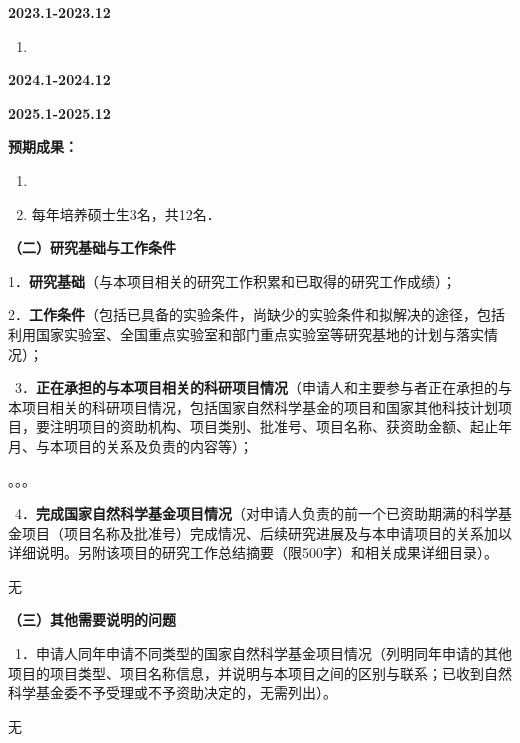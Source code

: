 \documentclass[UTF8,A4]{ctexart}
\newcommand{\blue}{\textcolor[rgb]{0.00,0.44,0.75}}
\begin{document}
\noindent\textbf{2023.1-2023.12}
\begin{enumerate}
  \item
\end{enumerate}


\noindent\textbf{2024.1-2024.12}



\noindent\textbf{2025.1-2025.12}




\textbf{预期成果：}

\begin{enumerate}
  \item
  \item 每年培养硕士生3名，共12名．
\end{enumerate}

\pagebreak[4]
\begin{spacing}{1.6}
\kaishu
\blue{\textbf{（二）研究基础与工作条件}}

\blue{1．\textbf{研究基础}（与本项目相关的研究工作积累和已取得的研究工作成绩）；}
\end{spacing}

\begin{spacing}{1.6}
\kaishu
\blue{2．\textbf{工作条件}（包括已具备的实验条件，尚缺少的实验条件和拟解决的途径，包括利用国家实验室、全国重点实验室和部门重点实验室等研究基地的计划与落实情况）；}
\end{spacing}


\pagebreak[4]
\begin{spacing}{1.6}
\kaishu
\blue{~3．\textbf{正在承担的与本项目相关的科研项目情况}（申请人和主要参与者正在承担的与本项目相关的科研项目情况，包括国家自然科学基金的项目和国家其他科技计划项目，要注明项目的资助机构、项目类别、批准号、项目名称、获资助金额、起止年月、与本项目的关系及负责的内容等）；}
\end{spacing}
。。。

\begin{spacing}{1.6}
\kaishu
\blue{~4．\textbf{完成国家自然科学基金项目情况}（对申请人负责的前一个已资助期满的科学基金项目（项目名称及批准号）完成情况、后续研究进展及与本申请项目的关系加以详细说明。另附该项目的研究工作总结摘要（限500字）和相关成果详细目录）。}
\end{spacing}
无

\begin{spacing}{1.6}
\kaishu

\end{spacing}
\pagebreak[4]
\begin{spacing}{1.6}
\kaishu
\blue{\textbf{（三）其他需要说明的问题}}

\blue{~1．申请人同年申请不同类型的国家自然科学基金项目情况（列明同年申请的其他项目的项目类型、项目名称信息，并说明与本项目之间的区别与联系；已收到自然科学基金委不予受理或不予资助决定的，无需列出）。}
\end{spacing}
无
\end{document}
